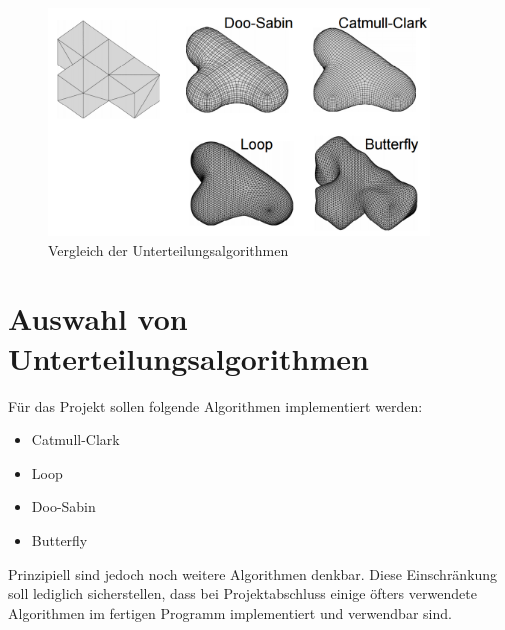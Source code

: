 \begin{figure}
  \centering
  \includegraphics[width=0.9\textwidth]{content/media/sd_overview.png}
  \caption{Vergleich der Unterteilungsalgorithmen \cite{Standford.24.07.2015}}
  \label{fig:sd_comp}
\end{figure}

\section{Auswahl von Unterteilungsalgorithmen}

Für das Projekt sollen folgende Algorithmen implementiert werden:

\begin{itemize}
	\item Catmull-Clark
	\item Loop
	\item Doo-Sabin
	\item Butterfly
\end{itemize}

Prinzipiell sind jedoch noch weitere Algorithmen denkbar.
Diese Einschränkung soll lediglich sicherstellen, dass bei Projektabschluss einige öfters verwendete Algorithmen im fertigen Programm implementiert und verwendbar sind.

